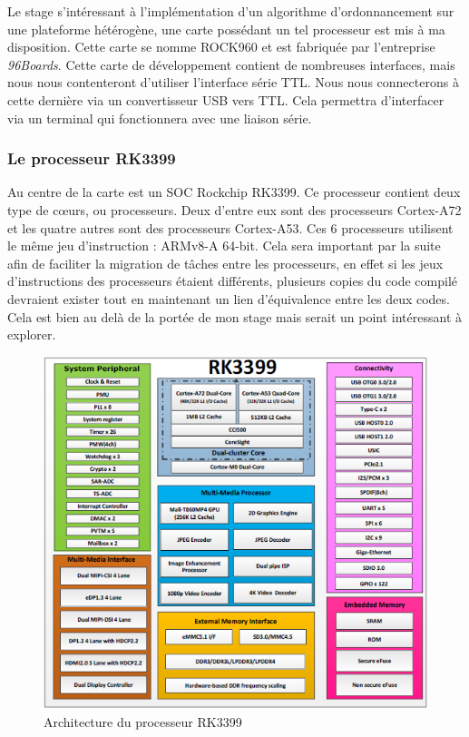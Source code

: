 Le stage s'intéressant à l'implémentation d'un algorithme d'ordonnancement sur une plateforme hétérogène, une carte possédant un tel processeur est mis à ma disposition. Cette carte se nomme ROCK960 et est fabriquée par l'entreprise \textit{96Boards}. Cette carte de développement contient de nombreuses interfaces, mais nous nous contenteront d'utiliser l'interface série TTL. Nous nous connecterons à cette dernière via un convertisseur USB vers TTL. Cela permettra d'interfacer via un terminal qui fonctionnera avec une liaison série. 

\subsubsection{Le processeur RK3399}
Au centre de la carte est un \gls{SOC} Rockchip RK3399. Ce processeur contient deux type de cœurs, ou processeurs. Deux d'entre eux sont des processeurs Cortex-A72 et les quatre autres sont des processeurs Cortex-A53. Ces 6 processeurs utilisent le même jeu d'instruction : ARMv8-A 64-bit. Cela sera important par la suite afin de faciliter la migration de tâches entre les processeurs, en effet si les jeux d'instructions des processeurs étaient différents, plusieurs copies du code compilé devraient exister tout en maintenant un lien d'équivalence entre les deux codes. Cela est bien au delà de la portée de mon stage mais serait un point intéressant à explorer.

\begin{figure}[H]
    \centering
    \includegraphics[width=0.45\paperwidth]{Images/RK3399_Block_Diagram.png}
    \caption{Architecture du processeur RK3399}
    \label{fig:archi_rk3399}
\end{figure}

